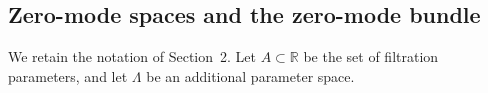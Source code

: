 \documentclass[10pt,a4paper]{amsart}
\newtheorem{proposition}[theorem]{Proposition}%
\newtheorem{definition}{Definition}%
\begin{document}





\subsection{Zero-mode spaces and the zero-mode bundle}

We retain the notation of Section~2. Let \(A\subset \mathbb{R}\) be the set of
filtration parameters, and let \(\Lambda\) be an additional parameter space.

\end{document}
